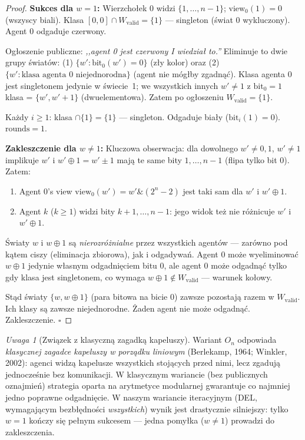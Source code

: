 \documentclass[12pt,a4paper]{article}
\theoremstyle{plain}
\theoremstyle{definition}
\theoremstyle{remark}
\newtheorem{remark}[theorem]{Uwaga}
\newcommand{\rounds}{\mathrm{rounds}}
\newcommand{\view}{\mathrm{view}}
\newcommand{\Wval}{W_{\mathrm{valid}}}
\begin{document}
\begin{proof}
\textbf{Sukces dla $w = 1$:} Wierzchołek 0 widzi $\{1,\ldots,n{-}1\}$; $\view_0(1) = 0$ (wszyscy biali). Klasa $[0,0] \cap \Wval = \{1\}$ — singleton (świat 0 wykluczony). Agent 0 odgaduje czerwony.

Ogłoszenie publiczne: \emph{,,agent 0 jest czerwony I wiedział to.''} Eliminuje to dwie grupy światów: (1) $\{w': \mathrm{bit}_0(w') = 0\}$ (zły kolor) oraz (2) $\{w': \text{klasa agenta 0 niejednorodna}\}$ (agent nie mógłby zgadnąć). Klasa agenta 0 jest singletonem jedynie w świecie~1; we wszystkich innych $w' \ne 1$ z $\mathrm{bit}_0 = 1$ klasa = $\{w', w'+1\}$ (dwuelementowa). Zatem po ogłoszeniu $\Wval = \{1\}$.

Każdy $i \ge 1$: klasa $\cap \{1\} = \{1\}$ — singleton. Odgaduje biały ($\mathrm{bit}_i(1) = 0$). $\rounds = 1$.

\textbf{Zakleszczenie dla $w \ne 1$:} Kluczowa obserwacja: dla dowolnego $w' \ne 0, 1$, $w' \ne 1$ implikuje $w'$ i $w' \oplus 1 = w' \pm 1$ mają te same bity $1, \ldots, n{-}1$ (flipa tylko bit 0). Zatem:
\begin{enumerate}
  \item Agent 0's view $\view_0(w') = w' \& (2^n{-}2)$ jest taki sam dla $w'$ i $w' \oplus 1$.
  \item Agent $k$ ($k \ge 1$) widzi bity $k{+}1, \ldots, n{-}1$: jego widok też nie różnicuje $w'$ i $w' \oplus 1$.
\end{enumerate}
Światy $w$ i $w \oplus 1$ są \emph{nierozróżnialne} przez wszystkich agentów — zarówno pod kątem ciszy (eliminacja zbiorowa), jak i odgadywań. Agent 0 może wyeliminować $w \oplus 1$ jedynie własnym odgadnięciem bitu 0, ale agent 0 może odgadnąć tylko gdy klasa jest singletonem, co wymaga $w \oplus 1 \notin \Wval$ — warunek kołowy.

Stąd światy $\{w, w \oplus 1\}$ (para bitowa na bicie 0) zawsze pozostają razem w $\Wval$. Ich klasy są zawsze niejednorodne. Żaden agent nie może odgadnąć. Zakleszczenie. $\square$
\end{proof}

\begin{remark}[Związek z klasyczną zagadką kapeluszy]
Wariant $O_n$ odpowiada \emph{klasycznej zagadce kapeluszy w porządku liniowym} (Berlekamp, 1964; Winkler, 2002): agenci widzą kapelusze wszystkich stojących przed nimi, lecz zgadują jednocześnie bez komunikacji. W klasycznym wariancie (bez publicznych oznajmień) strategia oparta na arytmetyce modularnej gwarantuje co najmniej jedno poprawne odgadnięcie. W naszym wariancie iteracyjnym (DEL, wymagającym bezbłędności \emph{wszystkich}) wynik jest drastycznie silniejszy: tylko $w = 1$ kończy się pełnym sukcesem — jedna pomyłka ($w \ne 1$) prowadzi do zakleszczenia.
\end{remark}
\end{document}

